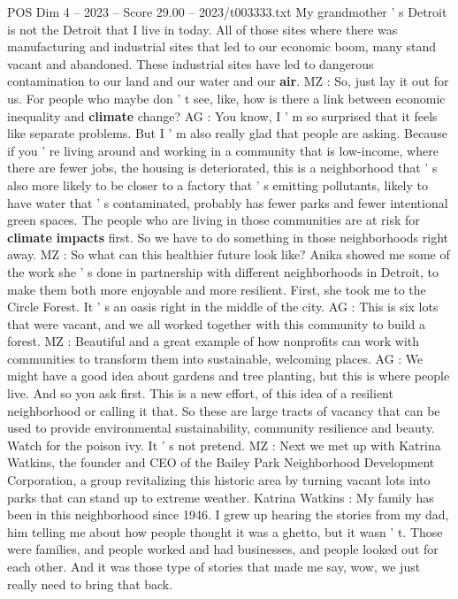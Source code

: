 \begin{textsample}{POS Dim 4 – 2023 – Score 29.00 – 2023/t003333.txt}
My grandmother ' s Detroit is not the Detroit that I live in today.
All of those sites where there was manufacturing and industrial sites that led to our economic boom, many stand vacant and abandoned.
These industrial sites have led to dangerous contamination to our land and our water and our \textbf{air}.
MZ : So, just lay it out for us.
For people who maybe don ' t see, like, how is there a link between economic inequality and \textbf{climate} change?
AG : You know, I ' m so surprised that it feels like separate problems.
But I ' m also really glad that people are asking.
Because if you ' re living around and working in a community that is low-income, where there are fewer jobs, the housing is deteriorated, this is a neighborhood that ' s also more likely to be closer to a factory that ' s emitting pollutants, likely to have water that ' s contaminated, probably has fewer parks and fewer intentional green spaces.
The people who are living in those communities are at risk for \textbf{climate} \textbf{impacts} first.
So we have to do something in those neighborhoods right away.
MZ : So what can this healthier future look like?
Anika showed me some of the work she ' s done in partnership with different neighborhoods in Detroit, to make them both more enjoyable and more resilient.
First, she took me to the Circle Forest.
It ' s an oasis right in the middle of the city.
AG : This is six lots that were vacant, and we all worked together with this community to build a forest.
MZ : Beautiful and a great example of how nonprofits can work with communities to transform them into sustainable, welcoming places.
AG : We might have a good idea about gardens and tree planting, but this is where people live.
And so you ask first.
This is a new effort, of this idea of a resilient neighborhood or calling it that.
So these are large tracts of vacancy that can be used to provide environmental sustainability, community resilience and beauty.
Watch for the poison ivy.
It ' s not pretend.
MZ : Next we met up with Katrina Watkins, the founder and CEO of the Bailey Park Neighborhood Development Corporation, a group revitalizing this historic area by turning vacant lots into parks that can stand up to extreme weather.
Katrina Watkins : My family has been in this neighborhood since 1946.
I grew up hearing the stories from my dad, him telling me about how people thought it was a ghetto, but it wasn ' t.
Those were families, and people worked and had businesses, and people looked out for each other.
And it was those type of stories that made me say, wow, we just really need to bring that back.

\end{textsample}
